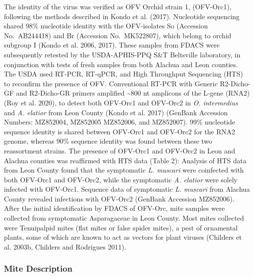 \documentclass[12pt,final,CPage]{ufthesis}
\begin{document}
{  The identity of the virus was verified as OFV Orchid strain 1, (OFV-Orc1), following the methods described in Kondo et al. (2017). Nucleotide sequencing shared 98\% nucleotide identity with the OFV-isolates So (Accession No.~AB244418) and Br (Accession No.~MK522807), which belong to orchid subgroup I (Kondo et al. 2006, 2017). These samples from FDACS were subsequently retested by the USDA-APHIS-PPQ S\&T Beltsville laboratory, in conjunction with tests of fresh samples from both Alachua and Leon counties. The USDA used RT-PCR, RT-qPCR, and High Throughput Sequencing (HTS) to reconfirm the presence of OFV. Conventional RT-PCR with Generic R2-Dicho-GF and R2-Dicho-GR primers amplified \textasciitilde800 nt amplicons of the L-gene (RNA2) (Roy et al. 2020), to detect both OFV-Orc1 and OFV-Orc2 in \emph{O. intermedius} and \emph{A. elatior} from Leon County (Kondo et al. 2017) (GenBank Accession Numbers: MZ852004, MZ852005 MZ852006, and MZ852007). 99\% nucleotide sequence identity is shared between OFV-Orc1 and OFV-Orc2 for the RNA2 genome, whereas 90\% sequence identity was found between these two reassortment strains. The presence of OFV-Orc1 and OFV-Orc2 in Leon and Alachua counties was reaffirmed with HTS data (Table 2): Analysis of HTS data from Leon County found that the symptomatic \emph{L. muscari} were coinfected with both OFV-Orc1 and OFV-Orc2, while the symptomatic \emph{A. elatior} were solely infected with OFV-Orc1. Sequence data of symptomatic \emph{L. muscari} from Alachua County revealed infections with OFV-Orc2 (GenBank Accession MZ852006). After the initial identification by FDACS of OFV-Orc, mite samples were collected from symptomatic Asparagaceae in Leon County. Most mites collected were Tenuipalpid mites (flat mites or false spider mites), a pest of ornamental plants, some of which are known to act as vectors for plant viruses (Childers et al. 2003b, Childers and Rodrigues 2011).

  \hypertarget{mite-description}{%
  \subsubsection{Mite Description}\label{mite-description}}

}
\end{document}
